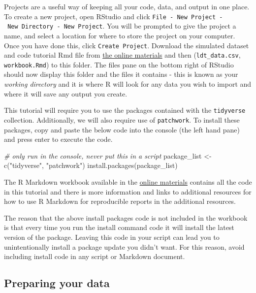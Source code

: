 \documentclass[
  english,
  doc,floatsintext]{apa6}
\newenvironment{Shaded}{\begin{snugshade}}{\end{snugshade}}
\newcommand{\CommentTok}[1]{\textcolor[rgb]{0.56,0.35,0.01}{\textit{#1}}}
\newcommand{\FunctionTok}[1]{\textcolor[rgb]{0.00,0.00,0.00}{#1}}
\newcommand{\NormalTok}[1]{#1}
\newcommand{\OtherTok}[1]{\textcolor[rgb]{0.56,0.35,0.01}{#1}}
\newcommand{\StringTok}[1]{\textcolor[rgb]{0.31,0.60,0.02}{#1}}
\begin{document}
Projects are a useful way of keeping all your code, data, and output in one place. To create a new project, open RStudio and click \texttt{File\ -\ New\ Project\ -\ New\ Directory\ -\ New\ Project}. You will be prompted to give the project a name, and select a location for where to store the project on your computer. Once you have done this, click \texttt{Create\ Project}. Download the simulated dataset and code tutorial Rmd file from \href{https://osf.io/bj83f/files/}{the online materials} and then (\texttt{ldt\_data.csv}, \texttt{workbook.Rmd}) to this folder. The files pane on the bottom right of RStudio should now display this folder and the files it contains - this is known as your \emph{working directory} and it is where R will look for any data you wish to import and where it will save any output you create.

This tutorial will require you to use the packages contained with the \texttt{tidyverse} collection. Additionally, we will also require use of \texttt{patchwork}. To install these packages, copy and paste the below code into the console (the left hand pane) and press enter to execute the code.

\begin{Shaded}
\begin{Highlighting}[]
\CommentTok{\# only run in the console, never put this in a script }
\NormalTok{package\_list }\OtherTok{\textless{}{-}} \FunctionTok{c}\NormalTok{(}\StringTok{"tidyverse"}\NormalTok{, }\StringTok{"patchwork"}\NormalTok{)}
\FunctionTok{install.packages}\NormalTok{(package\_list)}
\end{Highlighting}
\end{Shaded}

The R Markdown workbook available in the \href{https://osf.io/bj83f/files/}{online materials} contains all the code in this tutorial and there is more information and links to additional resources for how to use R Markdown for reproducible reports in the additional resources.

The reason that the above install packages code is not included in the workbook is that every time you run the install command code it will install the latest version of the package. Leaving this code in your script can lead you to unintentionally install a package update you didn't want. For this reason, avoid including install code in any script or Markdown document.

\hypertarget{preparing-your-data}{%
\subsection{Preparing your data}\label{preparing-your-data}}
\end{document}
